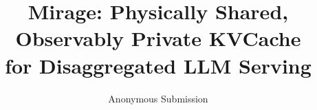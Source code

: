 \documentclass[letterpaper,twocolumn,10pt]{article}
\begin{document}
\date{}
\title{\Large \bf Mirage: Physically Shared, Observably Private KVCache\\
for Disaggregated LLM Serving}

\author{{\rm Anonymous Submission}}

\maketitle

















\appendix


\end{document}

